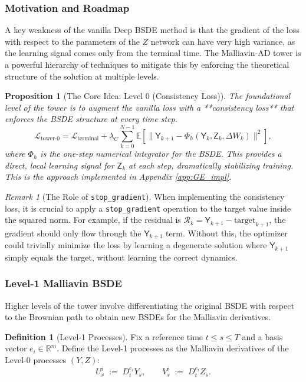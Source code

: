 \documentclass[11pt,letterpaper,oneside]{article}
\theoremstyle{plain}
\newtheorem{proposition}[theorem]{Proposition}
\theoremstyle{definition}
\newtheorem{definition}[theorem]{Definition}
\theoremstyle{remark}
\newtheorem{remark}{Remark}[section]
\begin{document}
\subsubsection{Motivation and Roadmap}
A key weakness of the vanilla Deep BSDE method is that the gradient of the loss with respect to the parameters of the \(Z\) network can have very high variance, as the learning signal comes only from the terminal time. The Malliavin-AD tower is a powerful hierarchy of techniques to mitigate this by enforcing the theoretical structure of the solution at multiple levels.

\begin{proposition}[The Core Idea: Level 0 (Consistency Loss)]
The foundational level of the tower is to augment the vanilla loss with a **consistency loss** that enforces the BSDE structure at every time step.
\[
\mathcal{L}_{\text{tower-0}} = \mathcal{L}_{\text{terminal}} + \lambda_C \sum_{k=0}^{N-1} \mathbb{E}\left[ \| \mathsf{Y}_{k+1} - \Phi_h(\mathsf{Y}_k, \mathsf{Z}_k, \Delta W_k) \|^2 \right],
\]
where \(\Phi_h\) is the one-step numerical integrator for the BSDE. This provides a direct, local learning signal for \(\mathsf{Z}_k\) at each step, dramatically stabilizing training. This is the approach implemented in Appendix \ref{app:GE_impl}.
\end{proposition}

\begin{remark}[The Role of \texttt{stop\_gradient}]
When implementing the consistency loss, it is crucial to apply a \texttt{stop\_gradient} operation to the target value inside the squared norm. For example, if the residual is $\mathcal{R}_k = \mathsf{Y}_{k+1} - \text{target}_{k+1}$, the gradient should only flow through the $\mathsf{Y}_{k+1}$ term. Without this, the optimizer could trivially minimize the loss by learning a degenerate solution where $\mathsf{Y}_{k+1}$ simply equals the target, without learning the correct dynamics.
\end{remark}

\subsubsection{Level-1 Malliavin BSDE}
Higher levels of the tower involve differentiating the original BSDE with respect to the Brownian path to obtain new BSDEs for the Malliavin derivatives.

\begin{definition}[Level-1 Processes]
Fix a reference time \(t\le s\le T\) and a basis vector \(e_i \in \mathbb{R}^m\). Define the Level-1 processes as the Malliavin derivatives of the Level-0 processes \((Y,Z)\):
\[
  U^{i}_{s}\;:=\;D_t^{e_i}Y_{s},
  \qquad
  V^{i}_{s}\;:=\;D_t^{e_i}Z_{s}.
\]
\end{definition}
\end{document}
